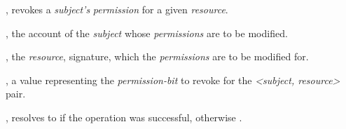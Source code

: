 \begin{interface}
\begin{functions}
    \item {},
      revokes a \emph{subject's} \emph{permission} for a given \emph{resource}.

      \begin{parameters}
        \item {}, the account  of the
          \emph{subject} whose \emph{permissions} are to be modified.

        \item {}, the \emph{resource}, 
          signature, which the \emph{permissions} are to be modified for.

        \item {}, a  value representing the
          \emph{permission-bit} to revoke for the \emph{<subject, resource>}
          pair.
      \end{parameters}
      \begin{returns}
        \item {}, resolves to  if the operation was
          successful, otherwise .
      \end{returns}
  \end{functions}
\end{interface}

